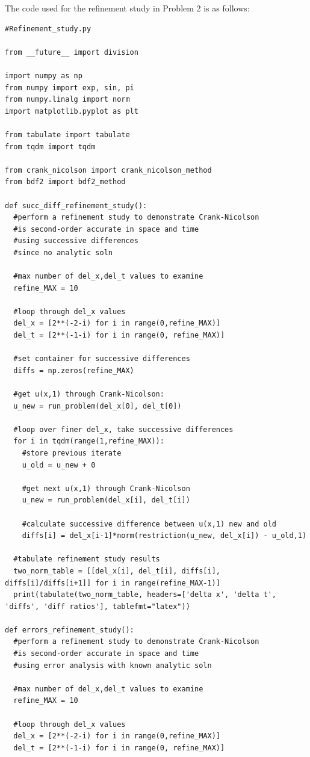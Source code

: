 \documentclass[12pt]{article}
\begin{document}
The code used for the refinement study in Problem 2 is as follows:
\begin{verbatim}
#Refinement_study.py

from __future__ import division

import numpy as np
from numpy import exp, sin, pi
from numpy.linalg import norm
import matplotlib.pyplot as plt

from tabulate import tabulate
from tqdm import tqdm

from crank_nicolson import crank_nicolson_method
from bdf2 import bdf2_method

def succ_diff_refinement_study():
  #perform a refinement study to demonstrate Crank-Nicolson
  #is second-order accurate in space and time
  #using successive differences
  #since no analytic soln

  #max number of del_x,del_t values to examine
  refine_MAX = 10

  #loop through del_x values
  del_x = [2**(-2-i) for i in range(0,refine_MAX)]
  del_t = [2**(-1-i) for i in range(0, refine_MAX)]

  #set container for successive differences
  diffs = np.zeros(refine_MAX)

  #get u(x,1) through Crank-Nicolson:
  u_new = run_problem(del_x[0], del_t[0])

  #loop over finer del_x, take successive differences
  for i in tqdm(range(1,refine_MAX)):
    #store previous iterate
    u_old = u_new + 0

    #get next u(x,1) through Crank-Nicolson
    u_new = run_problem(del_x[i], del_t[i])
    
    #calculate successive difference between u(x,1) new and old 
    diffs[i] = del_x[i-1]*norm(restriction(u_new, del_x[i]) - u_old,1)

  #tabulate refinement study results
  two_norm_table = [[del_x[i], del_t[i], diffs[i], diffs[i]/diffs[i+1]] for i in range(refine_MAX-1)] 
  print(tabulate(two_norm_table, headers=['delta x', 'delta t', 'diffs', 'diff ratios'], tablefmt="latex"))

def errors_refinement_study():
  #perform a refinement study to demonstrate Crank-Nicolson
  #is second-order accurate in space and time
  #using error analysis with known analytic soln

  #max number of del_x,del_t values to examine
  refine_MAX = 10

  #loop through del_x values
  del_x = [2**(-2-i) for i in range(0,refine_MAX)]
  del_t = [2**(-1-i) for i in range(0, refine_MAX)]


\end{verbatim}
\end{document}
